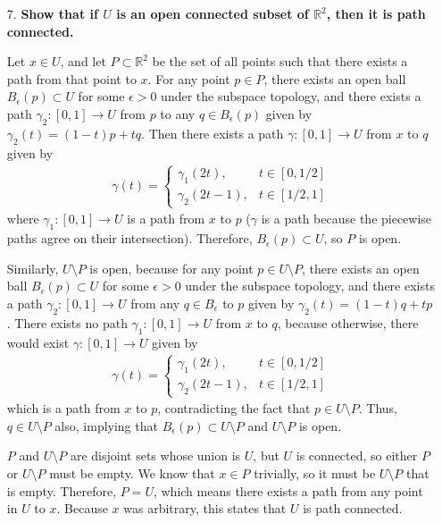 \documentclass[a4paper,12pt]{article}
\begin{document}
\begin{enumerate}
    \item[7.]
        \boldmath\textbf{Show that if $U$ is an open connected subset of $\mathbb{R}^2$, then it is path connected.
        }\unboldmath \par
        Let $x \in U$, and let $P \subset \mathbb{R}^2$ be the set of all points such that there exists a path from that point to $x$. For any point $p \in P$, there exists an open ball $B_\epsilon(p) \subset U$ for some $\epsilon > 0$ under the subspace topology, and there exists a path $\gamma_2 : [0, 1] \to U$ from $p$ to any $q \in B_\epsilon(p)$ given by $\gamma_2(t) = (1 - t)p + tq$. Then there exists a path $\gamma : [0, 1] \to U$ from $x$ to $q$ given by
        \begin{align*}
            \gamma(t) = \begin{cases}
                \gamma_1(2t), &t \in [0, 1/2] \\
                \gamma_2(2t - 1), &t \in [1/2, 1]
            \end{cases}
        \end{align*}
        where $\gamma_1 : [0, 1] \to U$ is a path from $x$ to $p$ ($\gamma$ is a path because the piecewise paths agree on their intersection). Therefore, $B_\epsilon(p) \subset U$, so $P$ is open. \par
        Similarly, $U \setminus P$ is open, because for any point $p \in U \setminus P$, there exists an open ball $B_\epsilon(p) \subset U$ for some $\epsilon > 0$ under the subspace topology, and there exists a path $\gamma_2 : [0, 1] \to U$ from any $q \in B_\epsilon$ to $p$ given by $\gamma_2(t) = (1 - t)q + tp$. There exists no path $\gamma_1 : [0, 1] \to U$ from $x$ to $q$, because otherwise, there would exist $\gamma : [0, 1] \to U$ given by
        \begin{align*}
            \gamma(t) = \begin{cases}
                \gamma_1(2t), &t \in [0, 1/2] \\
                \gamma_2(2t - 1), &t \in [1/2, 1]
            \end{cases}
        \end{align*}
        which is a path from $x$ to $p$, contradicting the fact that $p \in U \setminus P$. Thus, $q \in U \setminus P$ also, implying that $B_\epsilon(p) \subset U \setminus P$ and $U \setminus P$ is open. \par
        $P$ and $U \setminus P$ are disjoint sets whose union is $U$, but $U$ is connected, so either $P$ or $U \setminus P$ must be empty. We know that $x \in P$ trivially, so it must be $U \setminus P$ that is empty. Therefore, $P = U$, which means there exists a path from any point in $U$ to $x$. Because $x$ was arbitrary, this states that $U$ is path connected.


\end{enumerate}
\end{document}

